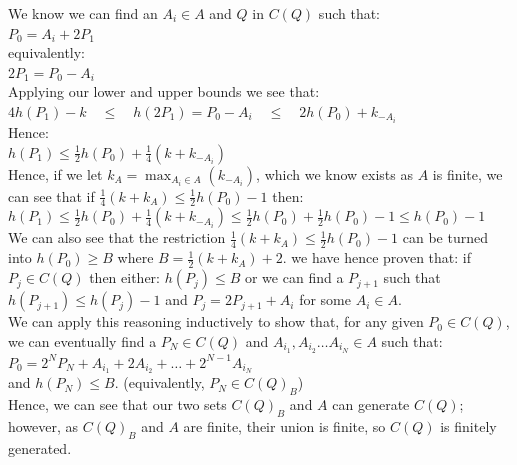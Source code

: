 \documentclass{article}
\begin{document}
We know we can find an $A_i \in A$ and $Q$ in $C(Q)$ such that:\\

$P_0 = A_i + 2P_1$\\

equivalently:\\

$2P_1 = P_0 - A_i$\\

Applying our lower and upper bounds we see that:\\

$4h(P_1) - k \quad \leq \quad  h(2P_1) =  P_0 - A_i  \quad  \leq  \quad  2h(P_0) + k_{-A_i} $\\

Hence:\\

$h(P_1) \leq \frac{1}{2}h(P_0) + \frac{1}{4} (k + k_{-A_i})$\\

Hence, if we let $k_A = \max_{A_i \in A}(k_{-A_i})$, which we know exists as $A$ is finite, we can see that if $\frac{1}{4}(k + k_A) \leq \frac{1}{2}h(P_0) - 1$ then:\\

$h(P_1) \leq \frac{1}{2}h(P_0) + \frac{1}{4} (k + k_{-A_i}) \leq \frac{1}{2}h(P_0) + \frac{1}{2}h(P_0) - 1 \leq h(P_0) - 1$\\

We can also see that the restriction $\frac{1}{4}(k + k_A) \leq \frac{1}{2}h(P_0) - 1$ can be turned into $h(P_0) \geq B$ where $B = \frac{1}{2}(k + k_A) + 2$. we have hence proven that: if $P_j \in C(Q)$ then either: $h(P_j) \leq B$ or we can find a $P_{j + 1}$ such that $h(P_{j + 1}) \leq h(P_j) - 1$ and $P_j = 2P_{j+1} + A_i$ for some $A_i \in A$.\\

We can apply this reasoning inductively to show that, for any given $P_0 \in C(Q)$, we can eventually find a $P_N \in C(Q)$ and $A_{i_1}, A_{i_2} \dots A_{i_N} \in A$ such that:\\

$P_0 = 2^N P_N + A_{i_1} + 2 A_{i_2} + \dots + 2^{N-1}A_{i_N}$\\

and $h(P_N) \leq B$. (equivalently, $P_N \in C(Q)_B$)\\

Hence, we can see that our two sets $C(Q)_B$ and $A$ can generate $C(Q)$; however, as $C(Q)_B$ and $A$ are finite, their union is finite, so $C(Q)$ is finitely generated.
\end{document}
